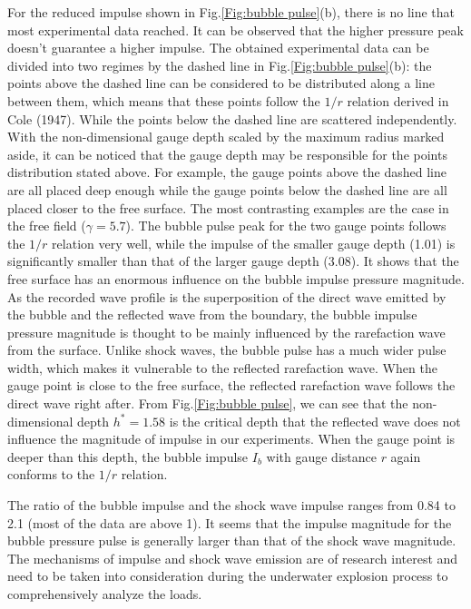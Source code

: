 \documentclass[%
 aip,
 amsmath,amssymb,
 reprint,%
]{revtex4-1}
\begin{document}
{For the reduced impulse shown in Fig.\ref{Fig:bubble pulse}(b),  there is no line that most experimental data reached. It can be observed that the higher pressure peak doesn't guarantee a higher impulse. The obtained experimental data can be divided into two regimes by the dashed line in Fig.\ref{Fig:bubble pulse}(b):  the points above the dashed line can be considered to be distributed along a line between them, which means that these points follow the $1/r$ relation derived in Cole\cite{RN2475} (1947). While the points below the dashed line are scattered independently. With the non-dimensional gauge depth scaled by the maximum radius marked aside, it can be noticed that the gauge depth may be responsible for the points distribution stated above. For example, the gauge points above the dashed line are all placed deep enough while the gauge points below the dashed line are all placed closer to the free surface. The most contrasting examples are the case in the free field ($\gamma=5.7$). The bubble pulse peak for the two gauge points follows the $1/r$ relation very well, while the impulse of the smaller gauge depth (1.01) is significantly smaller than that of the larger gauge depth (3.08). It shows that the free surface has an enormous influence on the bubble impulse pressure magnitude. As the recorded wave profile is the superposition of the direct wave emitted by the bubble and the reflected wave from the boundary, 
the bubble impulse pressure magnitude is thought to be mainly influenced by the rarefaction wave from the surface. Unlike shock waves, the bubble pulse has a much wider pulse width, which makes it vulnerable to the reflected rarefaction wave. When the gauge point is close to the free surface, the reflected rarefaction wave follows the direct wave right after. From Fig.\ref{Fig:bubble pulse}, we can see that the non-dimensional depth $h^*=1.58$ is the critical depth that the reflected wave does not influence the magnitude of impulse in our experiments. When the gauge point is deeper than this depth, the bubble impulse $I_b$ with gauge distance $r$ again conforms to the $1/r$ relation.

The ratio of the bubble impulse and the shock wave impulse ranges from 0.84 to 2.1 (most of the data are above 1). It seems that the impulse magnitude for the bubble pressure pulse is generally larger than that of the shock wave magnitude. The mechanisms of impulse and shock wave emission are of research interest and need to be taken into consideration during the underwater explosion process to comprehensively analyze the loads.
}
\end{document}
